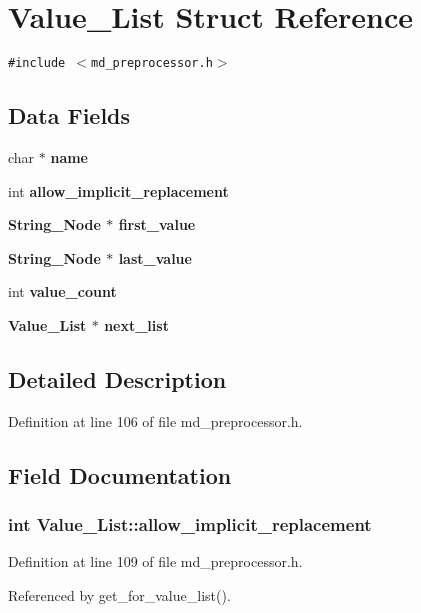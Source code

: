 \section{Value\_\-List Struct Reference}
\label{structValue__List}
{\tt \#include $<$md\_\-preprocessor.h$>$}

\subsection*{Data Fields}
\begin{CompactItemize}
\item 
char $\ast$ \bf{name}
\item 
int \bf{allow\_\-implicit\_\-replacement}
\item 
\bf{String\_\-Node} $\ast$ \bf{first\_\-value}
\item 
\bf{String\_\-Node} $\ast$ \bf{last\_\-value}
\item 
int \bf{value\_\-count}
\item 
\bf{Value\_\-List} $\ast$ \bf{next\_\-list}
\end{CompactItemize}


\subsection{Detailed Description}




Definition at line 106 of file md\_\-preprocessor.h.

\subsection{Field Documentation}
\subsubsection{\setlength{\rightskip}{0pt plus 5cm}int \bf{Value\_\-List::allow\_\-implicit\_\-replacement}}\label{structValue__List_b33c43bf208d4f59aae44ddaf39b4ec9}




Definition at line 109 of file md\_\-preprocessor.h.

Referenced by get\_\-for\_\-value\_\-list().

